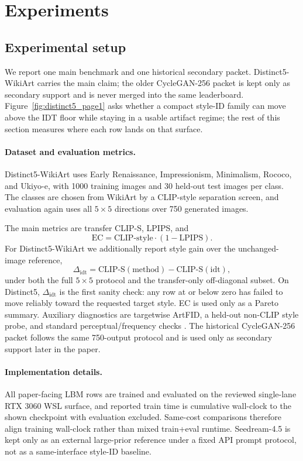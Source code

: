 \documentclass[letterpaper]{article}
\begin{document}
\section{Experiments}
\subsection{Experimental setup}
We report one main benchmark and one historical secondary packet. Distinct5-WikiArt carries the main claim; the older CycleGAN-256 packet is kept only as secondary support and is never merged into the same leaderboard. Figure~\ref{fig:distinct5_page1} asks whether a compact style-ID family can move above the IDT floor while staying in a usable artifact regime; the rest of this section measures where each row lands on that surface.

\paragraph{Dataset and evaluation metrics.}
Distinct5-WikiArt uses Early Renaissance, Impressionism, Minimalism, Rococo, and Ukiyo-e, with 1000 training images and 30 held-out test images per class. The classes are chosen from WikiArt by a CLIP-style separation screen, and evaluation again uses all $5\times5$ directions over 750 generated images.

The main metrics are transfer CLIP-S, LPIPS, and
\begin{equation}
    \mathrm{EC} = \mathrm{CLIP\mbox{-}style}\cdot(1-\mathrm{LPIPS}).
\end{equation}
For Distinct5-WikiArt we additionally report style gain over the unchanged-image reference,
\begin{equation}
    \Delta_{\mathrm{idt}} = \mathrm{CLIP\mbox{-}S}(\text{method}) - \mathrm{CLIP\mbox{-}S}(\text{idt}),
\end{equation}
under both the full $5\times5$ protocol and the transfer-only off-diagonal subset. On Distinct5, $\Delta_{\mathrm{idt}}$ is the first sanity check: any row at or below zero has failed to move reliably toward the requested target style. EC is used only as a Pareto summary. Auxiliary diagnostics are targetwise ArtFID, a held-out non-CLIP style probe, and standard perceptual/frequency checks \cite{ke2021musiq,yang2022maniqa,ding2020dists,binkowski2018kid}. The historical CycleGAN-256 packet follows the same 750-output protocol and is used only as secondary support later in the paper.

\paragraph{Implementation details.}
All paper-facing LBM rows are trained and evaluated on the reviewed single-lane RTX 3060 WSL surface, and reported train time is cumulative wall-clock to the shown checkpoint with evaluation excluded. Same-cost comparisons therefore align training wall-clock rather than mixed train+eval runtime. Seedream-4.5 is kept only as an external large-prior reference under a fixed API prompt protocol, not as a same-interface style-ID baseline.
\end{document}
